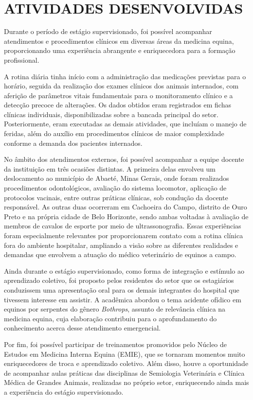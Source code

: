 \chapter{ATIVIDADES DESENVOLVIDAS}
\label{cap:atividades}

Durante o período de estágio supervisionado, foi possível acompanhar
atendimentos e procedimentos clínicos em diversas áreas da medicina
equina, proporcionando uma experiência abrangente e enriquecedora para a
formação profissional.

A rotina diária tinha início com a administração das medicações
previstas para o horário, seguida da realização dos exames clínicos dos
animais internados, com aferição de parâmetros vitais fundamentais para
o monitoramento clínico e a detecção precoce de alterações. Os dados
obtidos eram registrados em fichas clínicas individuais,
disponibilizadas sobre a bancada principal do setor. Posteriormente,
eram executadas as demais atividades, que incluíam o manejo de feridas,
além do auxílio em procedimentos clínicos de maior complexidade conforme
a demanda dos pacientes internados.

No âmbito dos atendimentos externos, foi possível acompanhar a equipe
docente da instituição em três ocasiões distintas. A primeira delas
envolveu um deslocamento ao município de Abaeté, Minas Gerais, onde
foram realizados procedimentos odontológicos, avaliação do sistema
locomotor, aplicação de protocolos vacinais, entre outras práticas
clínicas, sob condução da docente responsável. As outras duas ocorreram
em Cachoeira do Campo, distrito de Ouro Preto e na própria cidade de
Belo Horizonte, sendo ambas voltadas à avaliação de membros de cavalos
de esporte por meio de ultrassonografia. Essas experiências foram
especialmente relevantes por proporcionarem contato com a rotina clínica
fora do ambiente hospitalar, ampliando a visão sobre as diferentes
realidades e demandas que envolvem a atuação do médico veterinário de
equinos a campo.

Ainda durante o estágio supervisionado, como forma de integração e
estímulo ao aprendizado coletivo, foi proposto pelos residentes do setor
que os estagiários conduzissem uma apresentação oral para os demais
integrantes do hospital que tivessem interesse em assistir. A acadêmica
abordou o tema acidente ofídico em equinos por serpentes do gênero
\textit{Bothrops}, assunto de relevância clínica na medicina equina, cuja
elaboração contribuiu para o aprofundamento do conhecimento acerca desse
atendimento emergencial.

Por fim, foi possível participar de treinamentos promovidos pelo Núcleo
de Estudos em Medicina Interna Equina (EMIE), que se tornaram momentos
muito enriquecedores de troca e aprendizado coletivo. Além disso, houve
a oportunidade de acompanhar aulas práticas das disciplinas de
Semiologia Veterinária e Clínica Médica de Grandes Animais, realizadas
no próprio setor, enriquecendo ainda mais a experiência do estágio
supervisionado.
